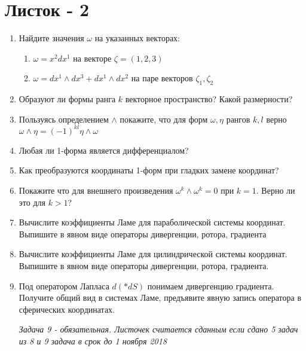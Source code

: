 \documentclass{article}
\begin{document}
 	
 	\newpage
 	{\centering
 		\section*{Листок - 2}}
 	\begin{enumerate}
 		\item Найдите значения $\omega$ на указанных векторах:
 		\begin{enumerate}
 			\item $\omega = x^2 dx^1$ на векторе $\zeta = (1,2,3)$
 			\item $\omega = d x^1 \wedge d x^3 + dx^1 \wedge dx^2 $ на паре векторов $\zeta_1, \zeta_2$
 		\end{enumerate}
 		\item Образуют ли формы ранга $k$ векторное пространство? Какой размерности?
 		\item Пользуясь определением $\wedge$ покажите, что для форм $\omega, \eta$ рангов $k,l$ верно $\omega \wedge \eta = (-1)^{kl} \eta \wedge \omega$
 		\item Любая ли 1-форма является дифференциалом? 
 		\item Как преобразуются координаты 1-форм при гладких замене координат?
 		\item Покажите что для внешнего произведения $\omega^k \wedge \omega^k = 0$ при $k=1$. Верно ли это для $k>1$?
 		\item Вычислите коэффициенты Ламе для параболической системы координат. Выпишите в явном виде операторы дивергенции, ротора, градиента
 		\item Вычислите коэффициенты Ламе для цилиндрической системы координат. Выпишите в явном виде операторы дивергенции, ротора, градиента.
 		\item Под оператором Лапласа $d(*dS)$ понимаем дивергенцию градиента. Получите общий вид в системах Ламе, предъявите явную запись оператора в сферических координатах.
 		
 		\vspace{\fill}
 		\textit{Задача 9 - обязательная. Листочек считается сданным если сдано 5 задач из 8 и 9 задача в срок до 1 ноября 2018}
 		
 	\end{enumerate}
 	\newpage
\end{document}
